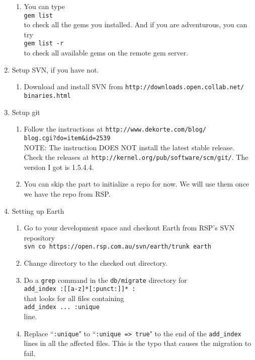 \documentclass{letter}
\begin{document}
\begin{enumerate}
\begin{enumerate}
	\item You can type \\
	{\tt gem list} \\
	to check all the gems you installed. And if you are adventurous, you can try \\ 
	{\tt gem list -r} \\
	to check all available gems on the remote gem server. 
	\end{enumerate}
\item Setup SVN, if you have not.
	\begin{enumerate}
	\item Download and install SVN from {\tt http://downloads.open.collab.net/\\binaries.html}
	\end{enumerate}
\item Setup git
	\begin{enumerate}
	\item Follow the instructions at {\tt http://www.dekorte.com/blog/\\blog.cgi?do=item\&id=2539} \\
	NOTE: The instruction DOES NOT install the latest stable release. Check the releases at {\tt http://kernel.org/pub/software/scm/git/}. The version I got is 1.5.4.4. 
	\item You can skip the part to initialize a repo for now. We will use them once we have the repo from RSP. 
	\end{enumerate}
\item Setting up Earth
	\begin{enumerate}
	\item Go to your development space and checkout Earth from RSP's SVN repository \\
	{\tt svn co https://open.rsp.com.au/svn/earth/trunk earth}
	\item Change directory to the checked out directory.
	\item Do a {\tt grep} command in the {\tt db/migrate} directory for \\ {\tt add\_index :[[a-z]*[:punct:]]* :} \\ that looks for all files containing \\ {\tt add\_index ... :unique} \\ line. 
	\item Replace ``{\tt :unique}" to  ``{\tt :unique => true}" to the end of the {\tt add\_index} lines in all the affected files. This is the typo that causes the migration to fail. \\

\end{enumerate}
\end{enumerate}
\end{document}
